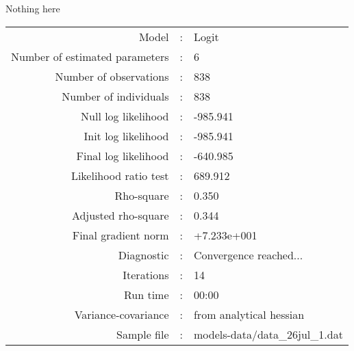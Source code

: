 Nothing here\\


\begin{flushleft}
\begin{tabular}{rcl}
\hline
Model &:& Logit\\
Number of estimated parameters&:&6\\
Number of  observations &:& 838\\
Number of individuals&:&838\\
Null log likelihood&:&-985.941\\
Init log likelihood&:&-985.941\\
Final log likelihood&:&-640.985\\
Likelihood ratio test &:&689.912\\
Rho-square&:&0.350\\
Adjusted rho-square&:&0.344\\
Final gradient norm&:&+7.233e+001\\
Diagnostic&:&Convergence reached...\\
Iterations&:&14\\
Run time&:&00:00\\
Variance-covariance&:&from analytical hessian
\\
Sample file&:&models-data/data_26jul_1.dat\\
\end{tabular}
\end{flushleft}
